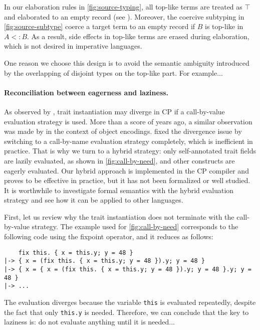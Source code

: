 In our elaboration rules in \autoref{fig:source-typing}, all top-like terms are
treated as $\top$ and elaborated to an empty record (see
). Moreover, the coercive subtyping
 in \autoref{fig:source-subtype} coerce a target term to an empty
record if $B$ is top-like in $A <: B$. As a result, side effects in top-like
terms are erased during elaboration, which is not desired in imperative
languages.

One reason we choose this design is to avoid the semantic ambiguity introduced
by the overlapping of disjoint types on the top-like part. For example...

\paragraph{Reconciliation between eagerness and laziness.}
As observed by \citet{fan2022direct}, trait instantiation may diverge in CP if a
call-by-value evaluation strategy is used. More than a score of years ago, a
similar observation was made by \citet{bruce1999comparing} in the context of
object encodings. \citeauthor{fan2022direct} fixed the divergence issue by
switching to a call-by-name evaluation strategy completely, which is inefficient
in practice. That is why we turn to a hybrid strategy: only self-annotated trait
fields are lazily evaluated, as shown in \autoref{fig:call-by-need}, and other
constructs are eagerly evaluated. Our hybrid approach is implemented in the CP
compiler and proves to be effective in practice, but it has not been formalized
or well studied. It is worthwhile to investigate formal semantics with the
hybrid evaluation strategy and see how it can be applied to other languages.

First, let us review why the trait instantiation does not terminate with the
call-by-value strategy. The example used for \autoref{fig:call-by-need}
corresponds to the following code using the fixpoint operator, and it reduces as
follows:
\begin{lstlisting}
    fix this. { x = this.y; y = 48 }
|-> { x = (fix this. { x = this.y; y = 48 }).y; y = 48 }
|-> { x = { x = (fix this. { x = this.y; y = 48 }).y; y = 48 }.y; y = 48 }
|-> ...
\end{lstlisting}
The evaluation diverges because the variable \lstinline{this} is evaluated
repeatedly, despite the fact that only \lstinline{this.y} is needed. Therefore,
we can conclude that the key to laziness is: do not evaluate anything until it
is needed...

